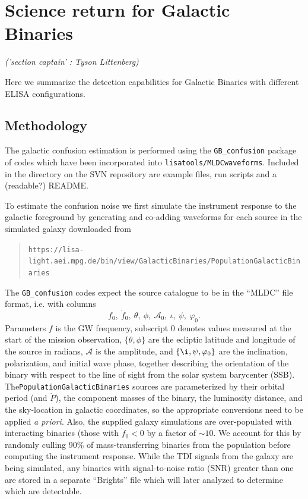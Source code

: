 \documentclass{iopart}
\begin{document}

\section{ Science return for Galactic Binaries }
\label{S:GalBin}
{ \it \small ('section captain' : Tyson Littenberg)}

Here we summarize the detection capabilities for Galactic Binaries with different ELISA configurations.

\subsection{Methodology}
The galactic confusion estimation is performed using the {\tt GB\_confusion} package of codes which have 
been incorporated into {\tt lisatools/MLDCwaveforms}.  Included in the directory on the SVN repository are 
example files, run scripts and a (readable?) README. 

To estimate the confusion noise we first simulate the instrument response to the galactic foreground by 
generating and co-adding waveforms for each source in the simulated galaxy downloaded from 
\begin{quotation}
{\tt https://lisa-light.aei.mpg.de/bin/view/GalacticBinaries/PopulationGalacticBinaries}
\end{quotation}  
The {\tt GB\_confusion} codes expect the source 
catalogue to be in the ``MLDC'' file format, i.e. with columns
\[f_0,\ \dot{f}_0,\ \theta,\ \phi,\ \mathcal{A}_0,\  \iota,\ \psi,\ \varphi_0. \]
Parameters $f$ is the GW frequency, subscript 0 denotes values measured at the start of the mission observation, $\{\theta,\phi\}$ are the 
ecliptic latitude and longitude of the source in radians, $\mathcal{A}$ is the amplitude, and $\{\i,\psi,\varphi_0\}$ are 
the inclination, polarization, and initial wave phase, together describing the orientation of the binary with respect 
to the line of sight from the solar system barycenter (SSB).  The{\tt PopulationGalacticBinaries} sources are parameterized 
by their orbital period (and $\dot{P}$), the component masses of the binary, the luminosity distance, and the sky-location in 
galactic coordinates, so the appropriate conversions need to be applied \emph{a priori}.  Also, the supplied galaxy simulations are over-populated with interacting binaries (those with $\dot{f}_0<0$ by a factor of $\sim10$.  We account for this by randomly
culling 90\% of mass-transferring binaries from the population before computing the instrument response.  While the TDI 
signals from the galaxy are being simulated, any binaries with signal-to-noise ratio (SNR) greater than one are stored in a 
separate ``Brights'' file which will later analyzed to determine which are detectable.
\end{document}
